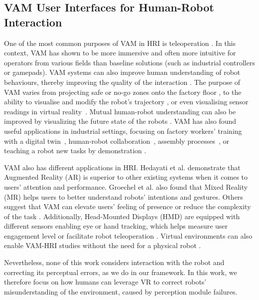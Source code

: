 \documentclass[letterpaper, 10 pt, conference]{ieeeconf}  %
\begin{document}
\subsection{VAM User Interfaces for Human-Robot Interaction}
One of the most common purposes of VAM in HRI is teleoperation \cite{rosen2018testing}. In this context, VAM has shown to be more immersive and often more intuitive for operators from various fields than baseline solutions (such as industrial controllers or gamepads). VAM systems can also improve human understanding of robot behaviours, thereby improving the quality of the interaction \cite{walker2018communicating}. The purpose of VAM  varies from projecting safe or no-go zones onto the factory floor \cite{chandan2021arroch}, to the ability to visualise and modify the robot's trajectory \cite{wozniakvirtual}, or even visualising sensor readings in virtual reality~\cite{groechel2022reimagining}. Mutual human-robot understanding can also be improved by visualizing the future state of the robots \cite{chandan2021arroch}. VAM has also found useful applications in industrial settings, focusing on factory workers' training with a digital twin~\cite{wang2021interactive}, human-robot collaboration~\cite{ortenzi2022robot}, assembly processes~\cite{guzzi2022conv}, or teaching a robot new tasks by demonstration \cite{9561844}.

VAM also has different applications in HRI. Hedayati et al. \cite{hedayati2018improving} demonstrate that Augmented Reality (AR) is superior to other existing systems when it comes to users' attention and performance. Groechel et al. \cite{groechel2019using} also found that Mixed Reality (MR) helps users to better understand robots' intentions and gestures. Others suggest that VAM can elevate users' feeling of presence \cite{pereira2017augmented} or reduce the complexity of the task \cite{ikeda2021ar}. Additionally, Head-Mounted Displays (HMD) are equipped with different sensors enabling eye or hand tracking, which helps measure user engagement level or facilitate robot teleoperation \cite{rosen2020mixed}. Virtual environments can also enable VAM-HRI studies without the need for a physical robot \cite{groechel2022reimagining}. 

Nevertheless, none of this work considers interaction with the robot and correcting its perceptual errors, as we do in our framework. In this work, we therefore focus on how humans can leverage VR to correct robots' misunderstanding of the environment, caused by perception module failures.
\end{document}
